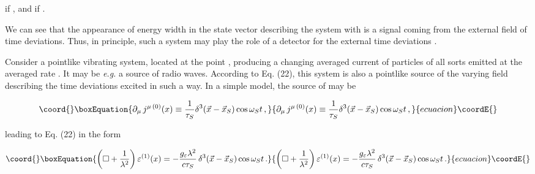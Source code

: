 \documentclass[a4paper,12pt]{article}
\begin{document}
\ni if \coordHE{}, and \coordHE{} if \coordHE{}.

We can see that the appearance of energy width \coordHE{} in the state vector \coordHE{} describing the system with \coordHE{} is a signal coming from the external field \coordHE{} of time deviations. Thus, in principle, such a system may play the role of a detector for the external time deviations \coordHE{}.

\vspace{0.2cm}


\vspace{0.2cm}

Consider a pointlike vibrating system, located at the point \coordHE{}, producing a changing averaged current \coordHE{} of particles of all sorts emitted at the averaged rate \coordHE{}. It may be {\it e.g.} a source of radio waves. According to Eq. (22), this system is also a pointlike source of the varying field \coordHE{} describing the time deviations \coordHE{} excited in such a way. In a simple model, the source \coordHE{} of \coordHE{} may be 

\begin{equation}\coord{}\boxEquation{
\partial_\mu \,j^{\mu\,(0)}(x) \equiv \frac{1}{\tau_S}\delta^3(\vec{x}-\vec{x}_S) \cos \omega_S t\,,
}{
\partial_\mu \,j^{\mu\,(0)}(x) \equiv \frac{1}{\tau_S}\delta^3(\vec{x}-\vec{x}_S) \cos \omega_S t\,,
}{ecuacion}\coordE{}\end{equation}

\ni leading to Eq. (22) in the form

\begin{equation}\coord{}\boxEquation{
\left( \Box + \frac{1}{\lambda^2}\right) \varepsilon^{(1)} (x) = - \frac{g_\varepsilon \lambda^2}{c \tau_S} \,\delta^3(\vec{x}-\vec{x}_S) \cos \omega_S t\,.
}{
\left( \Box + \frac{1}{\lambda^2}\right) \varepsilon^{(1)} (x) = - \frac{g_\varepsilon \lambda^2}{c \tau_S} \,\delta^3(\vec{x}-\vec{x}_S) \cos \omega_S t\,.
}{ecuacion}\coordE{}\end{equation}
\end{document}
